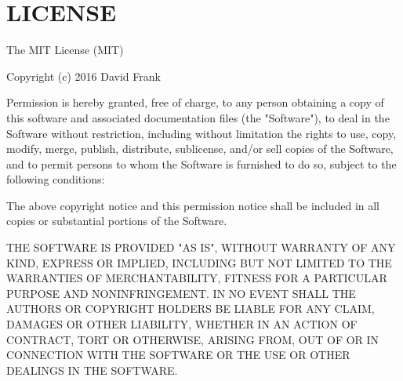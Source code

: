 \chapter{LICENSE}
\hypertarget{md_node__modules_2_0dsupabase_2node-fetch_2_l_i_c_e_n_s_e}{}\label{md_node__modules_2_0dsupabase_2node-fetch_2_l_i_c_e_n_s_e}
The MIT License (MIT)

Copyright (c) 2016 David Frank

Permission is hereby granted, free of charge, to any person obtaining a copy of this software and associated documentation files (the "{}\+Software"{}), to deal in the Software without restriction, including without limitation the rights to use, copy, modify, merge, publish, distribute, sublicense, and/or sell copies of the Software, and to permit persons to whom the Software is furnished to do so, subject to the following conditions\+:

The above copyright notice and this permission notice shall be included in all copies or substantial portions of the Software.

THE SOFTWARE IS PROVIDED "{}\+AS IS"{}, WITHOUT WARRANTY OF ANY KIND, EXPRESS OR IMPLIED, INCLUDING BUT NOT LIMITED TO THE WARRANTIES OF MERCHANTABILITY, FITNESS FOR A PARTICULAR PURPOSE AND NONINFRINGEMENT. IN NO EVENT SHALL THE AUTHORS OR COPYRIGHT HOLDERS BE LIABLE FOR ANY CLAIM, DAMAGES OR OTHER LIABILITY, WHETHER IN AN ACTION OF CONTRACT, TORT OR OTHERWISE, ARISING FROM, OUT OF OR IN CONNECTION WITH THE SOFTWARE OR THE USE OR OTHER DEALINGS IN THE SOFTWARE. 